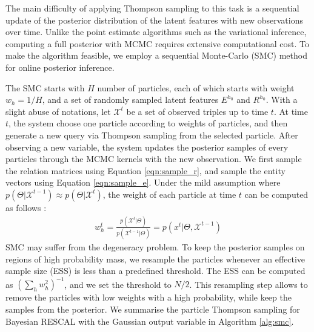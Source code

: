 The main difficulty of applying Thompson sampling to this task is a sequential update of the posterior distribution of the latent features with new observations over time. Unlike the point estimate algorithms such as
the variational inference, computing a full posterior with MCMC 
requires extensive computational cost. To make the algorithm feasible, we employ a sequential Monte-Carlo (SMC) method for online posterior inference.

The SMC starts with $H$ number of particles, each of which starts with weight $w_{h} = 1/H$, and a set of randomly sampled latent features $E^{h_0}$ and $R^{h_0}$. With a slight abuse of notations, let $\mathcal{X}^{t}$ be a set of observed triples up to time $t$. 
At time $t$, the system choose one particle according to weights of particles, 
and then generate a new query via Thompson sampling from the selected particle.
After observing a new variable, the system updates the posterior samples of 
every particles through the MCMC kernels with the new observation.
We first sample the relation matrices using Equation \ref{eqn:sample_r}, and sample the entity vectors using Equation \ref{eqn:sample_e}.
Under the mild assumption where 
$p(\Theta | \mathcal{X}^{t-1}) \approx p(\Theta | \mathcal{X}^{t})$, 
the weight of each particle at time $t$ can be computed as follows 
\cite{del2006sequential,chopin2002sequential}:
\begin{align}
w_{h}^{t} = \frac{p(\mathcal{X}^{t} | \Theta)}{p(\mathcal{X}^{t-1} | \Theta)}
 = p(x^{t} | \Theta, \mathcal{X}^{t-1})
\end{align}
SMC may suffer from the degeneracy problem. To keep the posterior samples
on regions of high probability mass, we resample the particles whenever 
an effective sample size (ESS) is less than a predefined threshold. 
The ESS can be computed as $(\sum_h w_h^2)^{-1}$, and we set the threshold 
to $N/2$. This resampling step allows to remove the particles with 
low weights with a high probability, while keep the samples from the posterior.
We summarise the particle Thompson sampling for Bayesian RESCAL with the Gaussian output variable in Algorithm \ref{alg:smc}.

%

